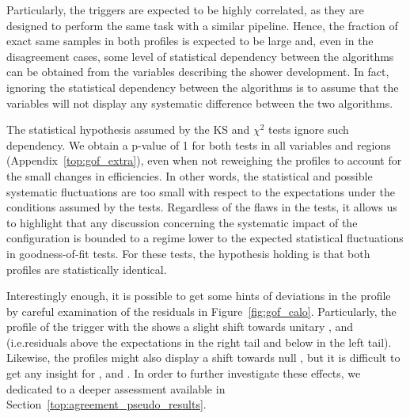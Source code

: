Particularly, the triggers are expected to be highly correlated, as they are
designed to perform the same task with a similar pipeline. Hence, the fraction
of exact same samples in both profiles is expected to be large and, even in the
disagreement cases, some level of statistical dependency between the algorithms
can be obtained from the variables describing the shower development.
In fact, ignoring the statistical dependency between the algorithms is to assume
that the variables will not display any systematic difference between the two
algorithms.

The statistical hypothesis assumed by the KS and $\chi^2$ tests
ignore such dependency. We obtain a p-value of 1 for both tests in all
variables and regions (Appendix~\ref{top:gof_extra}), even when not reweighing
the profiles to account for the small changes in efficiencies. In other words,
the statistical and possible systematic fluctuations are too small with respect
to the expectations under the conditions assumed by the tests. Regardless of the
flaws in the tests, it allows us to highlight that any discussion concerning the
systematic impact of the configuration is bounded to a regime lower to
the expected statistical fluctuations in goodness-of-fit tests. For these tests,
the hypothesis holding is that both profiles are statistically identical.

Interestingly enough, it is possible to get some hints of deviations in the
profile by careful examination of the residuals in Figure~\ref{fig:gof_calo}.
Particularly, the profile of the trigger with the \rnn{} shows a slight shift
towards unitary \reta{}, \rphi{} and \eratio{} (i.e.\@ residuals above the
expectations in the right tail and below in the left tail). Likewise, the
profiles might also display a shift towards null \rhad{}, but it is difficult to
get any insight for \weta{}, \fI{} and \fIII{}. In order to further investigate
these effects, we dedicated to a deeper assessment available in
Section~\ref{top:agreement_pseudo_results}.

